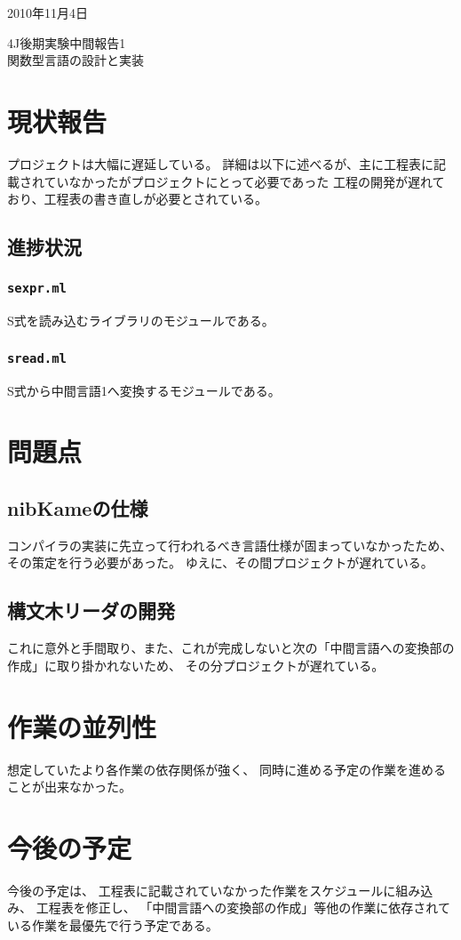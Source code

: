\documentclass[a4paper, 10pt, oneside, notitlepage, onecolumn]{jsarticle}
\author{}
\begin{document}
\begin{flushright}
    2010年11月4日
\end{flushright}
\begin{center}
    4J後期実験中間報告1\\
\hspace{0.1em}
    \textsc{\LARGE 関数型言語の設計と実装}
\end{center}
\begin{flushright}
\end{flushright}
\section{現状報告}
プロジェクトは大幅に遅延している。
詳細は以下に述べるが、主に工程表に記載されていなかったがプロジェクトにとって必要であった
工程の開発が遅れており、工程表の書き直しが必要とされている。

\subsection{進捗状況}
\subsubsection{\texttt{sexpr.ml}}
S式を読み込むライブラリのモジュールである。

\subsubsection{\texttt{sread.ml}}
S式から中間言語1へ変換するモジュールである。

\section{問題点}
\subsection{nibKameの仕様}
コンパイラの実装に先立って行われるべき言語仕様が固まっていなかったため、その策定を行う必要があった。
ゆえに、その間プロジェクトが遅れている。

\subsection{構文木リーダの開発}
これに意外と手間取り、また、これが完成しないと次の「中間言語への変換部の作成」に取り掛かれないため、
その分プロジェクトが遅れている。

\section{作業の並列性}
想定していたより各作業の依存関係が強く、
同時に進める予定の作業を進めることが出来なかった。

\section{今後の予定}
今後の予定は、
工程表に記載されていなかった作業をスケジュールに組み込み、
工程表を修正し、
「中間言語への変換部の作成」等他の作業に依存されている作業を最優先で行う予定である。
\end{document}
